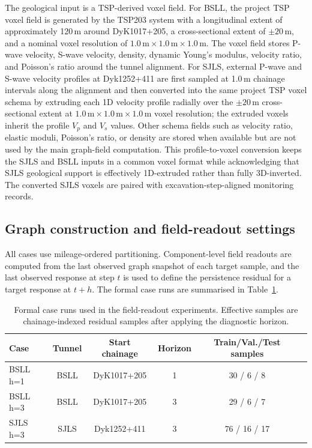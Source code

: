The geological input is a TSP-derived voxel field. For BSLL, the project TSP
voxel field is generated by the TSP203 system with a longitudinal extent of
approximately 120\,m around DyK1017+205, a cross-sectional extent of
$\pm 20$\,m, and a nominal voxel resolution of $1.0\,\mathrm{m}\times
1.0\,\mathrm{m}\times 1.0\,\mathrm{m}$. The voxel field stores P-wave velocity,
S-wave velocity, density, dynamic Young's modulus, velocity ratio, and
Poisson's ratio around the tunnel alignment. For SJLS, external P-wave and
S-wave velocity profiles at Dyk1252+411 are first sampled at 1.0\,m chainage
intervals along the alignment and then converted into the same project TSP
voxel schema by extruding each 1D velocity profile radially over the
$\pm 20$\,m cross-sectional extent at $1.0\,\mathrm{m}\times
1.0\,\mathrm{m}\times 1.0\,\mathrm{m}$ voxel resolution; the extruded voxels
inherit the profile $V_p$ and $V_s$ values. Other schema fields such as
velocity ratio, elastic moduli, Poisson's ratio, or density are stored when
available but are not used by the main graph-field computation. This profile-to-voxel
conversion keeps the SJLS and BSLL inputs in a common voxel format while
acknowledging that SJLS geological support is effectively 1D-extruded rather
than fully 3D-inverted.
The converted SJLS voxels are paired with excavation-step-aligned monitoring records.

\subsection{Graph construction and field-readout settings}
\label{sec:graph_construction_settings}

All cases use mileage-ordered partitioning. Component-level field readouts are
computed from the last observed graph snapshot of each target sample, and the
last observed response at step $t$ is used to define the persistence residual
for a target response at $t+h$. The formal case runs are summarised in
Table~\ref{tab:data_summary}.

\begin{table}[htbp]
\centering
\caption{Formal case runs used in the field-readout experiments. Effective samples
are chainage-indexed residual samples after applying the diagnostic horizon.}
\label{tab:data_summary}
\begin{tabular}{lccccc}
\toprule
Case & Tunnel & Start chainage & Horizon & Train/Val./Test samples \\
\midrule
BSLL h=1 & BSLL & DyK1017+205 & 1 & 30 / 6 / 8 \\
BSLL h=3 & BSLL & DyK1017+205 & 3 & 29 / 6 / 7 \\
SJLS h=3 & SJLS & Dyk1252+411 & 3 & 76 / 16 / 17 \\
\bottomrule
\end{tabular}
\end{table}

